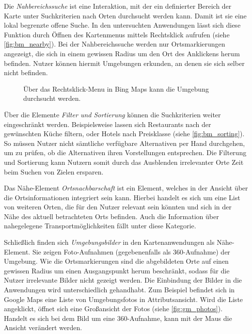 Die \emph{Nahbereichssuche} ist eine Interaktion, mit der ein definierter Bereich der Karte unter Suchkriterien nach Orten durchsucht werden kann.
Damit ist sie eine lokal begrenzte offene Suche.
In den untersuchten Anwendungen lässt sich diese Funktion durch Öffnen des Kartenmenus mittels Rechtsklick aufrufen (siehe \autoref{fig:bm_nearby}).
Bei der Nahbereichssuche werden nur Ortsmarkierungen angezeigt, die sich in einem gewissen Radius um den Ort des Anklickens herum befinden.
Nutzer können hiermit Umgebungen erkunden, an denen sie sich selber nicht befinden.
\begin{figure}[h]
    \centering
	\caption{Über das Rechtsklick-Menu in Bing Maps kann die Umgebung durchsucht werden.}
	\label{fig:bm_nearby}
\end{figure}

Über die Elemente \emph{Filter und Sortierung} können die Suchkriterien weiter eingeschränkt werden.
Beispielsweise lassen sich Restaurants nach der gewünschten Küche filtern, oder Hotels nach Preisklasse (siehe \autoref{fig:bm_sorting}).
So müssen Nutzer nicht sämtliche verfügbare Alternativen per Hand durchgehen, um zu prüfen, ob die Alternativen ihren Vorstellungen entsprechen.
Die Filterung und Sortierung kann Nutzern somit durch das Ausblenden irrelevanter Orte Zeit beim Suchen von Zielen ersparen.

Das Nähe-Element \emph{Ortsnachbarschaft} ist ein Element, welches in der Ansicht über die Ortsinformationen integriert sein kann.
Hierbei handelt es sich um eine List von weiteren Orten, die für den Nutzer relevant sein könnten und sich in der Nähe des aktuell betrachteten Orts befinden.
Auch die Information über nahegelegene Transportmöglichkeiten fällt unter diese Kategorie.

Schließlich finden sich \emph{Umgebungsbilder} in den Kartenanwendungen als Nähe-Element.
Sie zeigen Foto-Aufnahmen (gegebenenfalls als 360\textdegree-Aufnahme) der Umgebung.
Wie die Ortsmarkierungen sind die abgebildeten Orte auf einen gewissen Radius um einen Ausgangspunkt herum beschränkt, sodass für die Nutzer irrelevante Bilder nicht gezeigt werden.
Die Einbindung der Bilder in die Anwendungen wird unterschiedlich gehandhabt.
Zum Beispiel befindet sich in Google Maps eine Liste von Umgebungsfotos in Attributsansicht.
Wird die Liste angeklickt, öffnet sich eine Großansicht der Fotos (siehe \autoref{fig:gm_photos}).
Handelt es sich bei dem Bild um eine 360\textdegree-Aufnahme, kann mit der Maus die Ansicht verändert werden.

